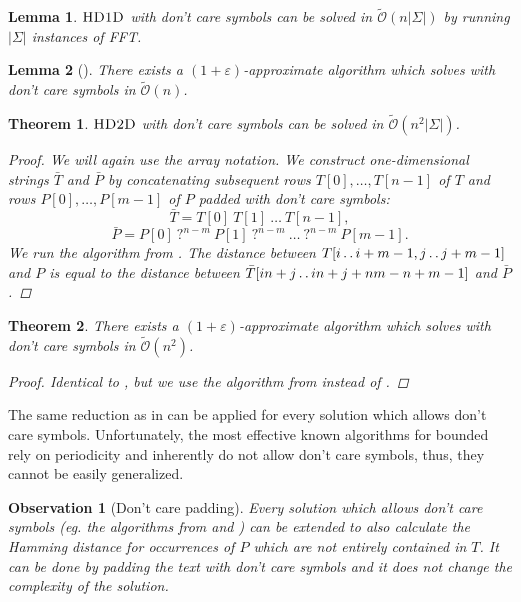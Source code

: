 \documentclass[11pt]{article}
\def\dd{\mathinner{.\,.}}
\newcommand{\tO}{\tilde{\mathcal{O}}}
\theoremstyle{plain}
\newtheorem{theorem}{Theorem}
\newtheorem{lemma}{Lemma}
\newtheorem{observation}{Observation}
\theoremstyle{definition}
\theoremstyle{remark}
\begin{document}
\begin{lemma}\label{sigman1d}
	$\textsc{HD1D}$ with don't care symbols can be solved in $\tO(n|\Sigma|)$ by running $|\Sigma|$ instances of FFT.
\end{lemma}


\begin{lemma}[\cite{Karloff1993}]\label{approx1d}
	There exists a $(1 + \varepsilon)$-approximate algorithm which solves \hd with don't care symbols in $\tO(n)$.
\end{lemma}


\begin{theorem}\label{sigman2d}
	$\textsc{HD2D}$ with don't care symbols can be solved in $\tO(n^2|\Sigma|)$.
	\begin{proof}
		We will again use the array notation.
		We construct one-dimensional strings $\bar{T}$ and $\bar{P}$ by concatenating subsequent rows $T[0], \dots, T[n - 1]$ of $T$ and rows $P[0], \dots, P[m - 1]$ of $P$ padded with don't care symbols:
		\[ \bar{T} = T[0] \ T[1] \ \dots \ T[n - 1], \]
		\[ \bar{P} = P[0] \ \texttt{?}^{n - m} \ P[1] \ \texttt{?}^{n - m} \ \dots \ \texttt{?}^{n - m} \ P[m - 1].\]
		We run the algorithm from .
		The distance between $T[i \dd i + m - 1, j \dd j + m - 1]$ and $P$ is equal to the distance between $\bar{T}[in + j \dd in + j + nm - n + m - 1]$ and $\bar{P}$.
	\end{proof}
\end{theorem}


\begin{theorem}\label{approx2d}
	There exists a $(1 + \varepsilon)$-approximate algorithm which solves \HD with don't care symbols in $\tO(n^2)$.
	\begin{proof}
		Identical to , but we use the algorithm from  instead of .
	\end{proof}
\end{theorem}


The same reduction as in  can be applied for every \hd solution which allows don't care symbols.
Unfortunately, the most effective known algorithms for bounded \hd~\cite{Clifford2015,Gawrychowski2017} rely on periodicity and inherently do not allow don't care symbols, thus, they cannot be easily generalized.


\begin{observation}[Don't care padding]\label{dontcare_padding}
	Every \HD solution which allows don't care symbols (eg. the algorithms from  and ) can be extended to also calculate the Hamming distance for occurrences of $P$ which are not entirely contained in $T$.
	It can be done by padding the text with don't care symbols and it does not change the complexity of the solution.
\end{observation}
\end{document}
